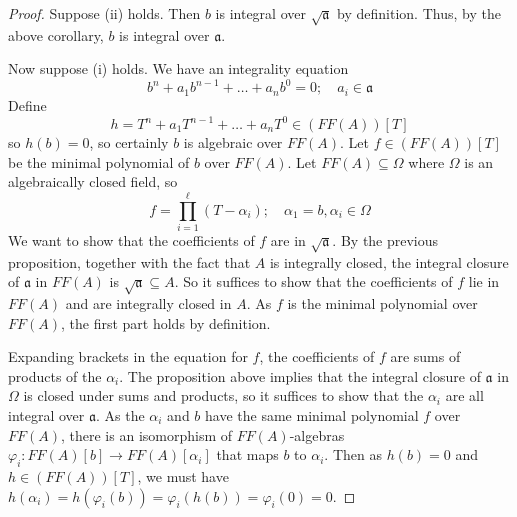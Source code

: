 \begin{proof}
    Suppose (ii) holds.
    Then \( b \) is integral over \( \sqrt{\mathfrak a} \) by definition.
    Thus, by the above corollary, \( b \) is integral over \( \mathfrak a \).

    Now suppose (i) holds.
    We have an integrality equation
    \[ b^n + a_1 b^{n-1} + \dots + a_n b^0 = 0;\quad a_i \in \mathfrak a \]
    Define
    \[ h = T^n + a_1 T^{n-1} + \dots + a_n T^0 \in (FF(A))[T] \]
    so \( h(b) = 0 \), so certainly \( b \) is algebraic over \( FF(A) \).
    Let \( f \in (FF(A))[T] \) be the minimal polynomial of \( b \) over \( FF(A) \).
    Let \( FF(A) \subseteq \Omega \) where \( \Omega \) is an algebraically closed field, so
    \[ f = \prod_{i=1}^\ell (T - \alpha_i);\quad \alpha_1 = b, \alpha_i \in \Omega \]
    We want to show that the coefficients of \( f \) are in \( \sqrt{\mathfrak a} \).
    By the previous proposition, together with the fact that \( A \) is integrally closed, the integral closure of \( \mathfrak a \) in \( FF(A) \) is \( \sqrt{\mathfrak a} \subseteq A \).
    So it suffices to show that the coefficients of \( f \) lie in \( FF(A) \) and are integrally closed in \( A \).
    As \( f \) is the minimal polynomial over \( FF(A) \), the first part holds by definition.

    Expanding brackets in the equation for \( f \), the coefficients of \( f \) are sums of products of the \( \alpha_i \).
    The proposition above implies that the integral closure of \( \mathfrak a \) in \( \Omega \) is closed under sums and products, so it suffices to show that the \( \alpha_i \) are all integral over \( \mathfrak a \).
    As the \( \alpha_i \) and \( b \) have the same minimal polynomial \( f \) over \( FF(A) \), there is an isomorphism of \( FF(A) \)-algebras \( \varphi_i : FF(A)[b] \to FF(A)[\alpha_i] \) that maps \( b \) to \( \alpha_i \).
    Then as \( h(b) = 0 \) and \( h \in (FF(A))[T] \), we must have \( h(\alpha_i) = h(\varphi_i(b)) = \varphi_i(h(b)) = \varphi_i(0) = 0 \).
\end{proof}

